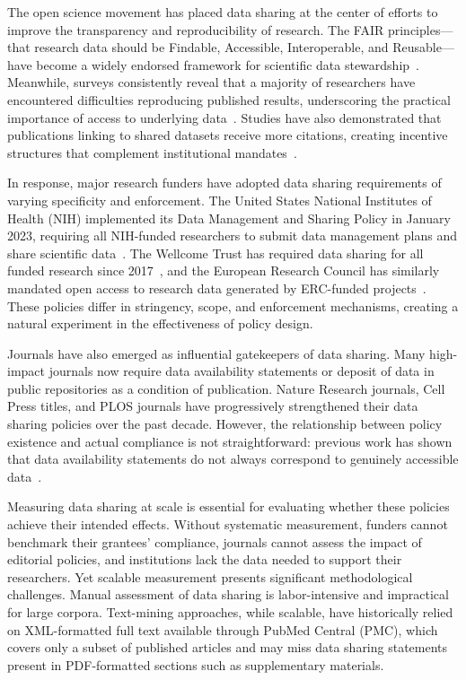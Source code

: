 The open science movement has placed data sharing at the center of efforts to improve the transparency and reproducibility of research. The FAIR principles---that research data should be Findable, Accessible, Interoperable, and Reusable---have become a widely endorsed framework for scientific data stewardship~\cite{Wilkinson2016-ap}. Meanwhile, surveys consistently reveal that a majority of researchers have encountered difficulties reproducing published results, underscoring the practical importance of access to underlying data~\cite{Baker2016-yj}. Studies have also demonstrated that publications linking to shared datasets receive more citations, creating incentive structures that complement institutional mandates~\cite{Colavizza2020-jf}.

In response, major research funders have adopted data sharing requirements of varying specificity and enforcement. The United States National Institutes of Health (NIH) implemented its Data Management and Sharing Policy in January 2023, requiring all NIH-funded researchers to submit data management plans and share scientific data~\cite{NIH2023dms}. The Wellcome Trust has required data sharing for all funded research since 2017~\cite{Wellcome-Trust2017-rs}, and the European Research Council has similarly mandated open access to research data generated by ERC-funded projects~\cite{European-Research-Council2017-mp}. These policies differ in stringency, scope, and enforcement mechanisms, creating a natural experiment in the effectiveness of policy design.

Journals have also emerged as influential gatekeepers of data sharing. Many high-impact journals now require data availability statements or deposit of data in public repositories as a condition of publication. Nature Research journals, Cell Press titles, and PLOS journals have progressively strengthened their data sharing policies over the past decade. However, the relationship between policy existence and actual compliance is not straightforward: previous work has shown that data availability statements do not always correspond to genuinely accessible data~\cite{Serghiou2021-pl}.

Measuring data sharing at scale is essential for evaluating whether these policies achieve their intended effects. Without systematic measurement, funders cannot benchmark their grantees' compliance, journals cannot assess the impact of editorial policies, and institutions lack the data needed to support their researchers. Yet scalable measurement presents significant methodological challenges. Manual assessment of data sharing is labor-intensive and impractical for large corpora. Text-mining approaches, while scalable, have historically relied on XML-formatted full text available through PubMed Central (PMC), which covers only a subset of published articles and may miss data sharing statements present in PDF-formatted sections such as supplementary materials.

